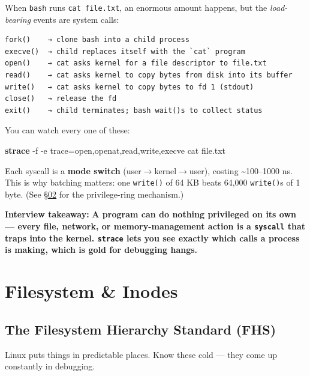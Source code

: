 \documentclass[11pt]{article}
\newenvironment{Shaded}{\begin{snugshade}}{\end{snugshade}}
\newcommand{\AttributeTok}[1]{\textcolor[rgb]{0.16,0.50,0.73}{#1}}
\newcommand{\ExtensionTok}[1]{\textcolor[rgb]{0.00,0.60,1.00}{\textbf{#1}}}
\newcommand{\NormalTok}[1]{\textcolor[rgb]{0.81,0.81,0.76}{#1}}
\begin{document}
When \texttt{bash} runs \texttt{cat\ file.txt}, an enormous amount happens, but the \emph{load-bearing} events are system calls:

\setcodelang{}

\begin{verbatim}
fork()    → clone bash into a child process
execve()  → child replaces itself with the `cat` program
open()    → cat asks kernel for a file descriptor to file.txt
read()    → cat asks kernel to copy bytes from disk into its buffer
write()   → cat asks kernel to copy bytes to fd 1 (stdout)
close()   → release the fd
exit()    → child terminates; bash wait()s to collect status
\end{verbatim}

You can watch every one of these:


\begin{Shaded}
\begin{Highlighting}[]
\ExtensionTok{strace} \AttributeTok{{-}f} \AttributeTok{{-}e}\NormalTok{ trace=open,openat,read,write,execve cat file.txt}
\end{Highlighting}
\end{Shaded}

Each syscall is a \textbf{mode switch} (user\(\rightarrow\)kernel\(\rightarrow\)user), costing \textasciitilde100--1000 ns. This is why batching matters: one \texttt{write()} of 64 KB beats 64,000 \texttt{write()}s of 1 byte. (See \hyperlink{section.02}{\textcolor{acc}{§02}} for the privilege-ring mechanism.)

\textbf{Interview takeaway:} \textbf{A program can do nothing privileged on its own --- every file, network, or memory-management action is a \texttt{syscall} that traps into the kernel. \texttt{strace} lets you see exactly which calls a process is making, which is gold for debugging hangs.}

\section{Filesystem \& Inodes}\label{filesystem--inodes}

\subsection{The Filesystem Hierarchy Standard (FHS)}\label{the-filesystem-hierarchy-standard-fhs}

Linux puts things in predictable places. Know these cold --- they come up constantly in debugging.
\end{document}

